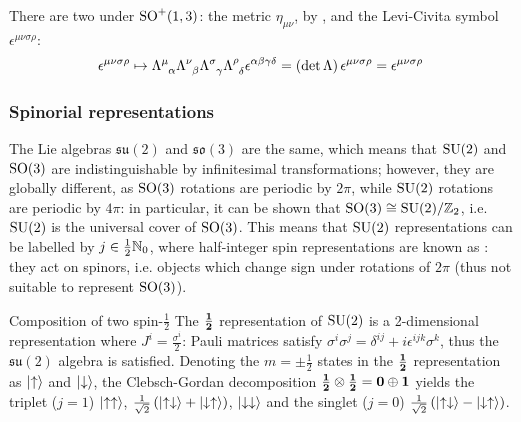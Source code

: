 There are two  under $ \mathrm{SO}^+(1,3) $: the metric $ \eta_{\mu \nu} $, by , and the Levi-Civita symbol $ \epsilon^{\mu \nu \sigma \rho} $:
\begin{equation*}
  \epsilon^{\mu \nu \sigma \rho} \mapsto \tensor{\Lambda}{^\mu_\alpha} \tensor{\Lambda}{^\nu_\beta} \tensor{\Lambda}{^\sigma_\gamma} \tensor{\Lambda}{^\rho_\delta} \epsilon^{\alpha \beta \gamma \delta} = \left( \det \Lambda \right) \epsilon^{\mu \nu \sigma \rho} = \epsilon^{\mu \nu \sigma \rho}
\end{equation*}

\subsubsection{Spinorial representations}

The Lie algebras $ \mathfrak{su}(2) $ and $ \mathfrak{so}(3) $ are the same, which means that $ \mathrm{SU}(2) $ and $ \mathrm{SO}(3) $ are indistinguishable by infinitesimal transformations; however, they are globally different, as $ \mathrm{SO}(3) $ rotations are periodic by $ 2\pi $, while $ \mathrm{SU}(2) $ rotations are periodic by $ 4\pi $: in particular, it can be shown that $ \mathrm{SO}(3) \cong \mathrm{SU}(2) / \mathbb{Z}_2 $, i.e. $ \mathrm{SU}(2) $ is the universal cover of $ \mathrm{SO}(3) $. This means that $ \mathrm{SU}(2) $ representations can be labelled by $ j \in \frac{1}{2} \mathbb{N}_0 $, where half-integer spin representations are known as : they act on spinors, i.e. objects which change sign under rotations of $ 2\pi $ (thus not suitable to represent $ \mathrm{SO}(3) $).

\begin{example}{Composition of two spin-$ \frac{1}{2} $}{}
  The $ \mathbf{\frac{1}{2}} $ representation of $ \mathrm{SU}(2) $ is a 2-dimensional representation where $ J^i = \frac{\sigma^i}{2} $: Pauli matrices satisfy $ \sigma^i \sigma^j = \delta^{ij} + i \epsilon^{ijk} \sigma^k $, thus the $ \mathfrak{su}(2) $ algebra is satisfied. Denoting the $ m = \pm \frac{1}{2} $ states in the $ \mathbf{\frac{1}{2}} $ representation as $ \ket{\uparrow} $ and $ \ket{\downarrow} $, the Clebsch-Gordan decomposition $ \mathbf{\frac{1}{2}} \otimes \mathbf{\frac{1}{2}} = \mathbf{0} \oplus \mathbf{1} $ yields the triplet ($ j = 1 $) $ \ket{\uparrow\uparrow} $, $ \frac{1}{\sqrt{2}}\left( \ket{\uparrow\downarrow} + \ket{\downarrow\uparrow} \right) $, $ \ket{\downarrow\downarrow} $ and the singlet ($ j = 0 $) $ \frac{1}{\sqrt{2}}\left( \ket{\uparrow\downarrow} - \ket{\downarrow\uparrow} \right) $.
\end{example}

